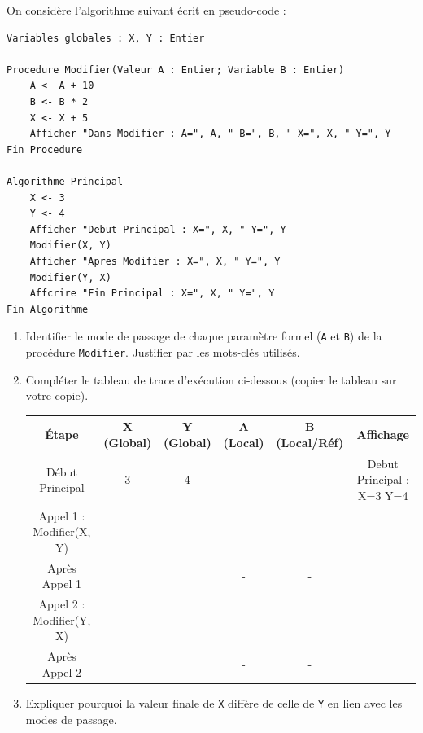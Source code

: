 \documentclass[11pt]{article}
\begin{document}
\begin{exercice}
On considère l'algorithme suivant écrit en pseudo-code :
\begin{verbatim}
Variables globales : X, Y : Entier

Procedure Modifier(Valeur A : Entier; Variable B : Entier)
    A <- A + 10
    B <- B * 2
    X <- X + 5
    Afficher "Dans Modifier : A=", A, " B=", B, " X=", X, " Y=", Y
Fin Procedure

Algorithme Principal
    X <- 3
    Y <- 4
    Afficher "Debut Principal : X=", X, " Y=", Y
    Modifier(X, Y)
    Afficher "Apres Modifier : X=", X, " Y=", Y
    Modifier(Y, X)
    Affcrire "Fin Principal : X=", X, " Y=", Y
Fin Algorithme
\end{verbatim}
\begin{enumerate}
    \item Identifier le mode de passage de chaque paramètre formel (\texttt{A} et \texttt{B}) de la procédure \texttt{Modifier}. Justifier par les mots-clés utilisés.
    \item Compléter le tableau de trace d'exécution ci-dessous (copier le tableau sur votre copie).
    \begin{tabular}{|c|c|c|c|c|c|}
    \hline
    \textbf{Étape} & \textbf{X (Global)} & \textbf{Y (Global)} & \textbf{A (Local)} & \textbf{B (Local/Réf)} & \textbf{Affichage} \\
    \hline
    Début Principal & 3 & 4 & - & - & Debut Principal : X=3 Y=4 \\
    \hline
    Appel 1 : Modifier(X, Y) & & & & & \\
    \hline
    Après Appel 1 & & & - & - & \\
    \hline
    Appel 2 : Modifier(Y, X) & & & & & \\
    \hline
    Après Appel 2 & & & - & - & \\
    \hline
    \end{tabular}
    \item Expliquer pourquoi la valeur finale de \texttt{X} diffère de celle de \texttt{Y} en lien avec les modes de passage.
\end{enumerate}
\end{exercice}
\end{document}

